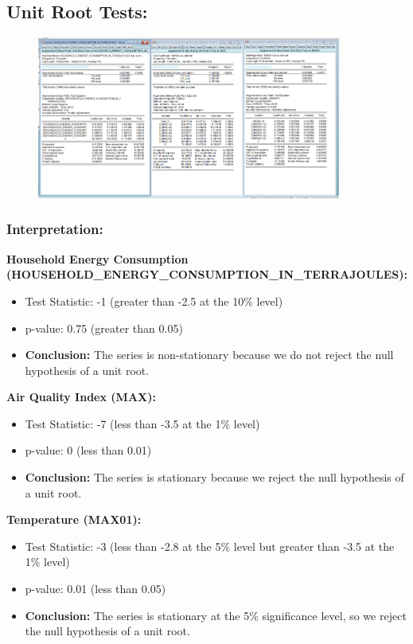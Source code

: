 \documentclass{article} %
\begin{document}
\begin{figure}[H]
\begin{minipage}{0.5\linewidth}
    \end{minipage}
\end{figure}

\subsection{Unit Root Tests:}

\begin{figure}[H]
    \centering
    \includegraphics[width=10cm]{images/image37.png}
\end{figure}

\subsubsection*{Interpretation:}
\textbf{Household Energy Consumption (HOUSEHOLD\_ENERGY\_CONSUMPTION\_IN\_TERRAJOULES):}
\begin{itemize}
    \item Test Statistic: -1 (greater than -2.5 at the 10\% level)
    \item p-value: 0.75 (greater than 0.05)
    \item \textbf{Conclusion:} The series is non-stationary because we do not reject the null hypothesis of a unit root.
\end{itemize}

\textbf{Air Quality Index (MAX):}
\begin{itemize}
    \item Test Statistic: -7 (less than -3.5 at the 1\% level)
    \item p-value: 0 (less than 0.01)
    \item \textbf{Conclusion:} The series is stationary because we reject the null hypothesis of a unit root.
\end{itemize}

\textbf{Temperature (MAX01):}
\begin{itemize}
    \item Test Statistic: -3 (less than -2.8 at the 5\% level but greater than -3.5 at the 1\% level)
    \item p-value: 0.01 (less than 0.05)
    \item \textbf{Conclusion:} The series is stationary at the 5\% significance level, so we reject the null hypothesis of a unit root.
\end{itemize}
\end{document}
